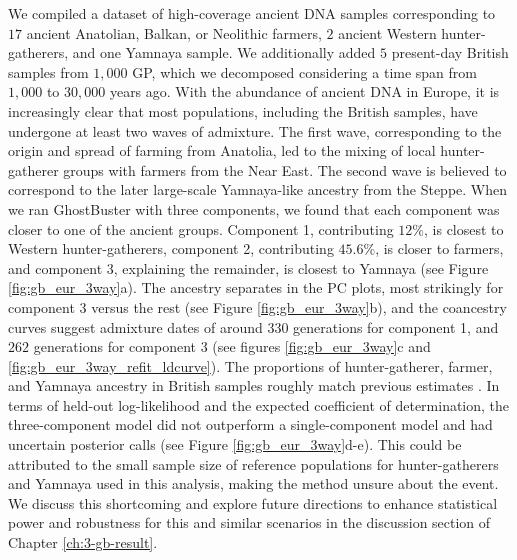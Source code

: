 We compiled a dataset of high-coverage ancient DNA samples corresponding to $17$ ancient Anatolian, Balkan, or Neolithic farmers, $2$ ancient Western hunter-gatherers, and one Yamnaya sample. We additionally added $5$ present-day British samples from $1{,}000$ GP, which we decomposed considering a time span from $1{,}000$ to $30{,}000$ years ago. With the abundance of ancient DNA in Europe, it is increasingly clear that most populations, including the British samples, have undergone at least two waves of admixture. The first wave, corresponding to the origin and spread of farming from Anatolia, led to the mixing of local hunter-gatherer groups with farmers from the Near East. The second wave is believed to correspond to the later large-scale Yamnaya-like ancestry from the Steppe. When we ran GhostBuster with three components, we found that each component was closer to one of the ancient groups. Component 1, contributing $12\%$, is closest to Western hunter-gatherers, component 2, contributing $45.6\%$, is closer to farmers, and component 3, explaining the remainder, is closest to Yamnaya (see Figure \ref{fig:gb_eur_3way}a). The ancestry separates in the PC plots, most strikingly for component 3 versus the rest (see Figure \ref{fig:gb_eur_3way}b), and the coancestry curves suggest admixture dates of around $330$ generations for component 1, and $262$ generations for component 3 (see figures \ref{fig:gb_eur_3way}c and \ref{fig:gb_eur_3way_refit_ldcurve}). The proportions of hunter-gatherer, farmer, and Yamnaya ancestry in British samples roughly match previous estimates \cite{haak2015massive}. In terms of held-out log-likelihood and the expected coefficient of determination, the three-component model did not outperform a single-component model and had uncertain posterior calls (see Figure \ref{fig:gb_eur_3way}d-e). This could be attributed to the small sample size of reference populations for hunter-gatherers and Yamnaya used in this analysis, making the method unsure about the event. We discuss this shortcoming and explore future directions to enhance statistical power and robustness for this and similar scenarios in the discussion section of Chapter \ref{ch:3-gb-result}.


